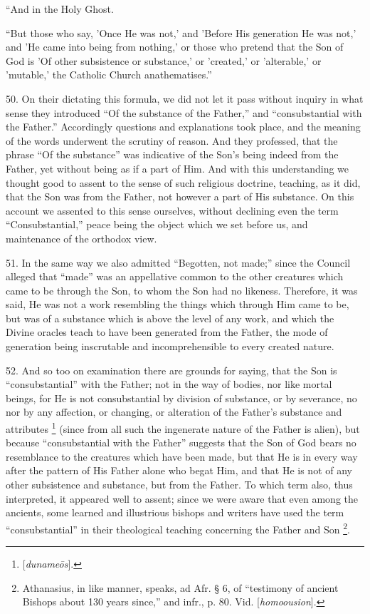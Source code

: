 ``And in the Holy Ghost.

``But those who say, 'Once He
was not,' and 'Before His generation He was not,' and 'He came into
being from nothing,' or those who pretend that the Son of God is 'Of
other subsistence or substance,' or 'created,' or 'alterable,' or
'mutable,' the Catholic Church anathematises.''

50. On their dictating this
formula, we did not let it pass without inquiry in what sense they
introduced ``Of the substance of the Father,'' and ``consubstantial with
the Father.'' Accordingly questions and explanations took place, and
the meaning of the words underwent the scrutiny of reason. And they
professed, that the phrase ``Of the substance'' was indicative of the
Son's being indeed from the Father, yet without being as if a part of
Him. And with this understanding we thought good to assent to the
sense of such religious doctrine, teaching, as it did, that the Son
was from the Father, not however a part of His substance. On this
account we assented to this sense ourselves, without declining even
the term ``Consubstantial,'' peace being the object which we set before
us, and maintenance of the orthodox view.

51. In the same way we also
admitted ``Begotten, not made;'' since the Council alleged that ``made''
was an appellative common to the other creatures which came to be
through the Son, to whom the Son had no likeness. Therefore, it was
said, He was not a work resembling the things which through Him came
to be, but was of a substance which is above the level of any work,
and which the Divine oracles teach to have been generated from the
Father, the mode of generation being inscrutable and incomprehensible
to every created nature.

52. And so too on examination
there are grounds for saying, that the Son is ``consubstantial'' with
the Father; not in the way of bodies, nor like mortal beings, for He
is not consubstantial by division of substance, or by severance, no
nor by any affection, or changing, or alteration of the Father's
substance and attributes \footnote{[\emph{duname\={o}s}].}
(since from all such the ingenerate nature of the Father is alien),
but because ``consubstantial with the Father'' suggests that the Son of
God bears no resemblance to the creatures which have been made, but
that He is in every way after the pattern of His Father alone who
begat Him, and that He is not of any other subsistence and substance,
but from the Father. To which term also, thus interpreted, it appeared
well to assent; since we were aware that even among the ancients, some
learned and illustrious bishops and writers have used the term ``consubstantial''
in their theological teaching concerning the Father and Son \footnote{Athanasius, in like manner, speaks, ad Afr. § 6, of ``testimony of
ancient Bishops about 130 years since,'' and infr., p. 80. Vid. [\emph{homoousion}].}.

